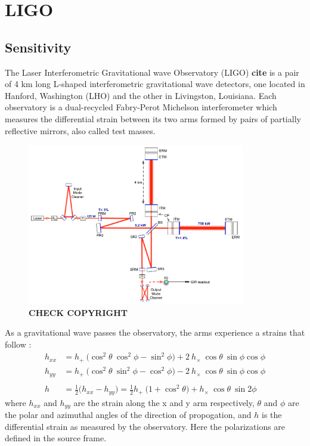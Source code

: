 \documentclass [12pt, proquest]{uwthesis}[2019]
\begin{document}
\section{LIGO}

\subsection{Sensitivity}

The Laser Interferometric Gravitational wave Observatory (LIGO) \textbf{cite} is a pair of 4 km long L-shaped interferometric gravitational wave detectors, one located in Hanford, Washington (LHO) and the other in Livingston, Louisiana. Each observatory is a dual-recycled Fabry-Perot Michelson interferometer which measures the differential strain between its two arms formed by pairs of partially reflective mirrors, also called test masses. 

\begin{figure}%
\begin{center}
\includegraphics[width=0.85\textwidth]{LIGO_Schematic.pdf}
\caption{\textbf{CHECK COPYRIGHT}}
\label{LIGO_Schematic}
\end{center}
\end{figure}

As a gravitational wave passes the observatory, the arms experience a strains that follow \cite{GWBook}:
\begin{align}
h_{xx}&=h_+\ \big( \cos^2\theta\ \cos^2\phi-\sin^2\phi \big)+2\ h_\times\ \cos \theta\ \sin \phi \cos \phi \\
h_{yy}&=h_+\ \big( \cos^2\theta\ \sin^2\phi-\cos^2\phi \big)-2\ h_\times\ \cos \theta\ \sin \phi \cos \phi \\
\nonumber \\
h&=\frac{1}{2} \big( h_{xx}-h_{yy} \big)=\frac{1}{2}h_+\ \big( 1+\cos^2\theta \big)+ h_\times\ \cos \theta\ \sin 2 \phi 
\end{align}
where $h_{xx}$ and $h_{yy}$ are the strain along the x and y arm respectively, $\theta$ and $\phi$ are the polar and azimuthal angles of the direction of propogation, and $h$ is the differential strain as measured by the observatory. Here the polarizations are defined in the source frame.
\end{document}
